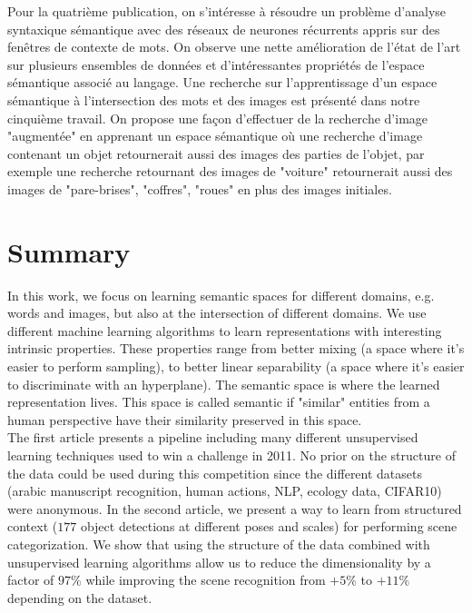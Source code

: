 \vspace{-0.2cm}
Pour la quatrième publication, on s'intéresse à résoudre un problème d'analyse
syntaxique sémantique avec des réseaux de neurones récurrents appris sur des
fenêtres de contexte de mots.  On observe une nette amélioration de l'état de
l'art sur plusieurs ensembles de données et d'intéressantes propriétés de
l'espace sémantique associé au langage.  Une recherche sur l'apprentissage d'un
espace sémantique à l'intersection des mots et des images est présenté dans
notre cinquième travail. On propose une façon d'effectuer de la recherche
d'image "augmentée" en apprenant un espace sémantique où une recherche d'image
contenant un objet retournerait aussi des images des parties de l'objet, par
exemple une recherche retournant des images de  "voiture" retournerait aussi
des images de "pare-brises", "coffres", "roues" en plus des images initiales.
 
\chapter*{Summary}

In this work, we focus on learning semantic spaces for different domains, e.g.
words and images, but also at the intersection of different domains. We use
different machine learning algorithms to learn representations with interesting
intrinsic properties. These properties range from better mixing (a space where
it's easier to perform sampling), to better linear separability (a space where
it's easier to discriminate with an hyperplane). The semantic space is where
the learned representation lives. This space is called semantic if "similar"
entities from a human perspective have their similarity preserved in this
space.
\\

The first article presents a pipeline including many different unsupervised
learning techniques used to win a challenge in 2011. No prior on the structure
of the data could be used during this competition since the different datasets
(arabic manuscript recognition, human actions, NLP, ecology data, CIFAR10) were
anonymous. In the second article, we present a way to learn from structured
context ($177$ object detections at different poses and scales) for performing
scene categorization. We show that using the structure of the data combined
with unsupervised learning algorithms allow us to reduce the dimensionality by
a factor of $97\%$ while improving the scene recognition from $+5\%$ to $+11\%$
depending on the dataset.\\

